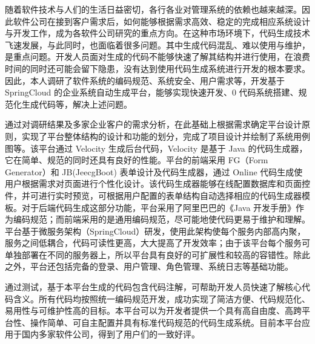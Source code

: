 \documentclass{izdthesis}
\begin{document}
\makecover

\makedeclaration

\begin{cnabstract}
随着软件技术与人们的生活日益密切，各行各业对管理系统的依赖也越来越深。因此软件公司在接到客户需求后，如何能够根据需求高效、稳定的完成相应系统设计与开发工作，成为各软件公司研究的重点方向。在这种市场环境下，代码生成技术飞速发展，与此同时，也面临着很多问题。其中生成代码混乱、难以使用与维护，是重点问题。开发人员面对生成的代码不能够快速了解其结构并进行使用，在浪费时间的同时还可能会留下隐患，没有达到使用代码生成系统进行开发的根本要求。因此，本人调研了软件系统的编码规范、系统安全、用户需求等，开发基于 SpringCloud 的企业系统自动生成平台，能够实现快速开发、0 代码系统搭建、规范化生成代码等，解决上述问题。

通过对调研结果及多家企业客户的需求分析，在此基础上根据需求确定平台设计原则，实现了平台整体结构的设计和功能的划分，完成了项目设计并绘制了系统用例图等。该平台通过 Velocity 生成后台代码，Velocity 是基于 Java 的代码生成器，它在简单、规范的同时还具有良好的性能。平台的前端采用 FG（Form Generator）和 JB(JeecgBoot) 表单设计及代码生成器，通过 Online 代码生成使用户根据需求对页面进行个性化设计。该代码生成器能够在线配置数据库和页面控件，并可进行实时预览，可根据用户配置的表单结构自动选择相应的代码生成器模板。对于后端代码生成这部分功能，平台采用了阿里巴巴的《Java 开发手册》作为编码规范；而前端采用的是通用编码规范，尽可能地使代码更易于维护和理解。平台基于微服务架构（SpringCloud）研发，使用此架构使每个服务内部高内聚，服务之间低耦合，代码可读性更高，大大提高了开发效率；由于该平台每个服务可单独部署在不同的服务器上，所以平台具有良好的可扩展性和较高的容错性。除此之外，平台还包括完备的登录、用户管理、角色管理、系统日志等基础功能。

通过测试，基于本平台生成的代码包含代码注解，可帮助开发人员快速了解核心代码含义。所有代码均按照统一编码规范开发，成功实现了简洁方便、代码规范化、易用性与可维护性高的目标。本平台可以为开发者提供一个具有高自由度、高跨平台性、操作简单、可自主配置并具有标准代码规范的代码生成系统。目前本平台应用于国内多家软件公司，得到了用户们的一致好评。

\end{cnabstract}
\end{document}
